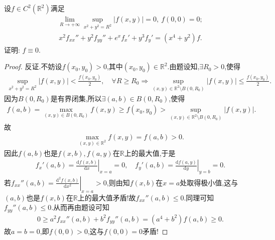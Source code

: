 \documentclass[../../main.tex]{subfiles}%
\begin{document}
\begin{example}
设$f\in C^2(\mathbb{R}^2)$满足
\begin{align*}
\lim\limits_{R\to+\infty}\sup\limits_{x^2+y^2=R^2}|f(x,y)|=0,\ f(0,0)=0;
\end{align*}
\begin{align*}
x^2f_{xx}''+y^2f_{yy}''+e^xf_x'+y^3f_y'=(x^4+y^2)f.
\end{align*}
证明: $f\equiv0$.
\end{example}
\begin{proof}

反证.不妨设$f(x_0,y_0)>0$,其中$(x_0,y_0)\in\mathbb{R}^2$.由题设知,$\exists R_0>0$,使得
\begin{align*}
\sup\limits_{x^2+y^2=R^2}|f(x,y)|<\frac{f(x_0,y_0)}{2},\quad\forall R\geqslant R_0\Longrightarrow \sup\limits_{(x,y)\in\mathbb{R}^2\setminus B(0,R_0)}|f(x,y)|\leqslant\frac{f(x_0,y_0)}{2}.
\end{align*}
因为$B(0,R_0)$是有界闭集,所以$\exists (a,b)\in B(0,R_0)$,使得
\begin{align*}
f(a,b)=\max\limits_{(x,y)\in B(0,R_0)}f(x,y)\geqslant f(x_0,y_0)>\sup\limits_{(x,y)\in\mathbb{R}^2\setminus B(0,R_0)}|f(x,y)|.
\end{align*}
故
\begin{align*}
\max\limits_{(x,y)\in\mathbb{R}^2}f(x,y)=f(a,b)>0.
\end{align*}
因此$f(a,b)$也是$f(x,b),f(a,y)$在$\mathbb{R}$上的最大值,于是
\begin{align*}
f_x'(a,b)=\left.\frac{\mathrm{d}f(x,b)}{\mathrm{d}x}\right|_{x=a}=0,\quad f_y'(a,b)=\left.\frac{\mathrm{d}f(a,y)}{\mathrm{d}y}\right|_{y=b}=0.
\end{align*}
若$f_{xx}''(a,b)=\left.\frac{\mathrm{d}^2f(x,b)}{\mathrm{d}x^2}\right|_{x=a}>0$,则由知$f(x,b)$在$x=a$处取得极小值,这与$(a,b)$也是$f(x,b)$在$\mathbb{R}$上的最大值矛盾!故$f_{xx}''(a,b)\leqslant 0$.同理可知$f_{yy}''(a,b)\leqslant 0$.从而再由题设可知
\begin{align*}
0\geqslant a^2f_{xx}''(a,b)+b^2f_{yy}''(a,b)=(a^4+b^2)f(a,b)\geqslant 0.
\end{align*}
故$a=b=0$,即$f(0,0)>0$,这与$f(0,0)=0$矛盾!
\end{proof}
\end{document}
